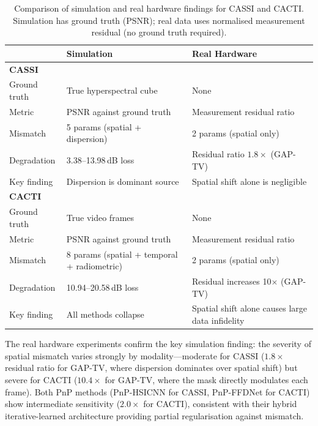\documentclass[runningheads]{llncs}
\begin{document}
\begin{table}[h]
\centering
\caption{Comparison of simulation and real hardware findings for CASSI and CACTI. Simulation has ground truth (PSNR); real data uses normalised measurement residual (no ground truth required).}
\label{tab:sim_vs_real}
\begin{tabular}{@{}lp{5cm}p{5cm}@{}}
\toprule
& \textbf{Simulation} & \textbf{Real Hardware} \\
\midrule
\textbf{CASSI} & & \\
\quad Ground truth & True hyperspectral cube & None \\
\quad Metric & PSNR against ground truth & Measurement residual ratio \\
\quad Mismatch & 5 params (spatial + dispersion) & 2 params (spatial only) \\
\quad Degradation & 3.38--13.98\,dB loss & Residual ratio $1.8\times$ (GAP-TV) \\
\quad Key finding & Dispersion is dominant source & Spatial shift alone is negligible \\
\midrule
\textbf{CACTI} & & \\
\quad Ground truth & True video frames & None \\
\quad Metric & PSNR against ground truth & Measurement residual ratio \\
\quad Mismatch & 8 params (spatial + temporal + radiometric) & 2 params (spatial only) \\
\quad Degradation & 10.94--20.58\,dB loss & Residual increases 10$\times$ (GAP-TV) \\
\quad Key finding & All methods collapse & Spatial shift alone causes large data infidelity \\
\bottomrule
\end{tabular}
\end{table}

The real hardware experiments confirm the key simulation finding: the severity of spatial mismatch varies strongly by modality---moderate for CASSI ($1.8\times$ residual ratio for GAP-TV, where dispersion dominates over spatial shift) but severe for CACTI ($10.4\times$ for GAP-TV, where the mask directly modulates each frame).
Both PnP methods (PnP-HSICNN for CASSI, PnP-FFDNet for CACTI) show intermediate sensitivity ($2.0\times$ for CACTI), consistent with their hybrid iterative-learned architecture providing partial regularisation against mismatch.

\end{document}
